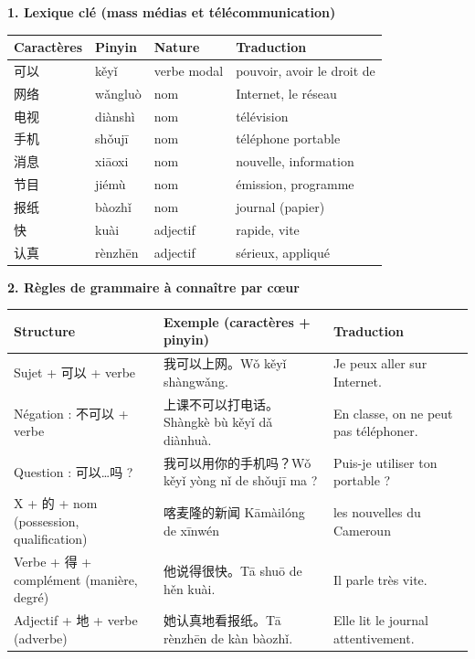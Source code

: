 \documentclass[11pt]{article}
\begin{document}
\begin{bilan}
\textbf{1. Lexique clé (mass médias et télécommunication)}
\begin{center}
\begin{tabularx}{\linewidth}{|X|X|X|X|}
\hline
\rowcolor{popblueL} Caractères & Pinyin & Nature & Traduction \\
\hline
可以 & kěyǐ & verbe modal & pouvoir, avoir le droit de \\
\hline
网络 & wǎngluò & nom & Internet, le réseau \\
\hline
电视 & diànshì & nom & télévision \\
\hline
手机 & shǒujī & nom & téléphone portable \\
\hline
消息 & xiāoxi & nom & nouvelle, information \\
\hline
节目 & jiémù & nom & émission, programme \\
\hline
报纸 & bàozhǐ & nom & journal (papier) \\
\hline
快 & kuài & adjectif & rapide, vite \\
\hline
认真 & rènzhēn & adjectif & sérieux, appliqué \\
\hline
\end{tabularx}
\end{center}

\textbf{2. Règles de grammaire à connaître par cœur}
\begin{center}
\begin{tabularx}{\linewidth}{|X|X|X|}
\hline
\rowcolor{popblueL} Structure & Exemple (caractères + pinyin) & Traduction \\
\hline
Sujet + 可以 + verbe & 我可以上网。Wǒ kěyǐ shàngwǎng. & Je peux aller sur Internet. \\
\hline
Négation : 不可以 + verbe & 上课不可以打电话。Shàngkè bù kěyǐ dǎ diànhuà. & En classe, on ne peut pas téléphoner. \\
\hline
Question : 可以…吗 ? & 我可以用你的手机吗？Wǒ kěyǐ yòng nǐ de shǒujī ma ? & Puis-je utiliser ton portable ? \\
\hline
X + 的 + nom (possession, qualification) & 喀麦隆的新闻 Kāmàilóng de xīnwén & les nouvelles du Cameroun \\
\hline
Verbe + 得 + complément (manière, degré) & 他说得很快。Tā shuō de hěn kuài. & Il parle très vite. \\
\hline
Adjectif + 地 + verbe (adverbe) & 她认真地看报纸。Tā rènzhēn de kàn bàozhǐ. & Elle lit le journal attentivement. \\
\hline
\end{tabularx}
\end{center}


\end{bilan}
\end{document}
